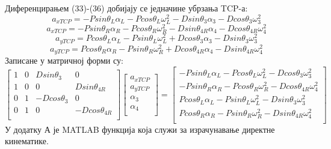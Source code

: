 \documentclass[12pt]{article}
\begin{document}
Диференцирањем (33)-(36) добијају се једначине убрзања TCP-а:
\begin{equation}
    a_{xTCP} = - Psin\theta_L\alpha_L - Pcos\theta_L\omega_L^2 - Dsin\theta_3\alpha_3 - Dcos\theta_3\omega_3^2
\end{equation}
\begin{equation}
    a_{xTCP} =  - Psin\theta_R\alpha_R - Pcos\theta_R\omega_R^2 - Dsin\theta_{4R}\alpha_4 - Dcos\theta_{4R}\omega_4^2
\end{equation}
\begin{equation}
    a_{yTCP} = Pcos\theta_L\alpha_L - Psin\theta_L\omega_L^2 + Dcos\theta_3\alpha_3 - Dsin\theta_3\omega_3^2 
\end{equation}
\begin{equation}
    a_{yTCP} = Pcos\theta_R\alpha_R - Psin\theta_R\omega_R^2 + Dcos\theta_{4R}\alpha_4 - Dsin\theta_{4R}\omega_4^2
\end{equation}
Записане у матричној форми су:
\begin{equation}
\begin{bmatrix}
1 & 0 & Dsin\theta_3 & 0\\
1 & 0 & 0 & Dsin\theta_{4R}\\
0 & 1 & -Dcos\theta_3 & 0\\
0 & 1 & 0 & -Dcos\theta_{4R}\\
\end{bmatrix}
\begin{bmatrix}
a_{xTCP}\\
a_{yTCP}\\
\alpha_3\\
\alpha_4\\
\end{bmatrix}
=
\begin{bmatrix}
- Psin\theta_L\alpha_L - Pcos\theta_L\omega_L^2 - Dcos\theta_3\omega_3^2\\
- Psin\theta_R\alpha_R - Pcos\theta_R\omega_R^2 - Dcos\theta_{4R}\omega_4^2\\
Pcos\theta_L\alpha_L - Psin\theta_L\omega_L^2 - Dsin\theta_3\omega_3^2\\
Pcos\theta_R\alpha_R - Psin\theta_R\omega_R^2 - Dsin\theta_{4R}\omega_4^2\\
\end{bmatrix}
\end{equation}
У додатку А је MATLAB функција која служи за израчунавање директне кинематике.
\end{document}
